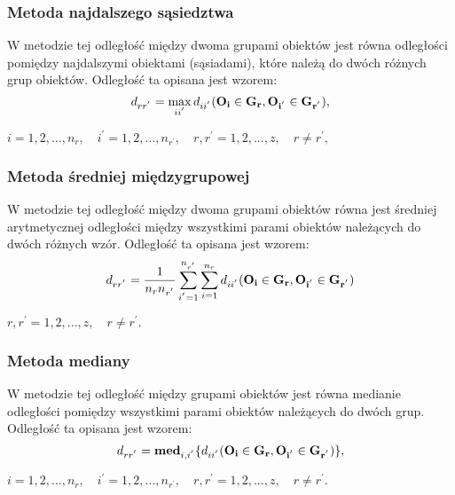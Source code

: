 \documentclass[12pt,a4paper]{report}
\begin{document}
\subsubsection{Metoda najdalszego sąsiedztwa}
\noindent

W metodzie tej odległość między dwoma grupami obiektów jest równa odległości pomiędzy najdalszymi obiektami (sąsiadami), które należą do dwóch różnych grup obiektów. Odległość ta opisana jest wzorem: 
\begin{equation}
d_{rr^{'}}= \max\limits_{ii^{'}} {d_{ii^{'}}(\bf{O_i} \in G_{r}, O_{i^{'}} \in G_{r^{'}})},
\end{equation}
\begin{center}
$i=1,2,...,n_{r}, \quad i^{'}=1,2,...,n_{r^{'}}, \quad r,r^{'}=1,2,...,z, \quad r \neq r^{'}, $
\end{center}

\subsubsection{Metoda średniej międzygrupowej}
\noindent

W metodzie tej odległość między dwoma grupami obiektów równa jest średniej arytmetycznej odległości między wszystkimi parami obiektów należących do dwóch różnych wzór. Odległość ta opisana jest wzorem: 
\begin{equation}
d_{rr^{'}}=\frac{1}{n_{r}n_{r^{'}}}\sum_{i^{'}=1}^{n_{r^{'}}}\sum_{i=1}^{n_{r}} d_{ii^{'}}(\bf{O_i} \in G_{r}, O_{i^{'}} \in G_{r^{'}})
\end{equation}
\begin{center}
$r,r^{'}=1,2,...,z, \quad r \neq r^{'}. $
\end{center}

\subsubsection{Metoda mediany}
\noindent

W metodzie tej odległość między grupami obiektów jest równa medianie odległości pomiędzy wszystkimi parami obiektów należących do dwóch grup. Odległość ta opisana jest wzorem: 
\begin{equation}
d_{rr^{'}}= \bold{med}_{i,i^{'}} \{d_{ii^{'}}(\bf{O_i} \in G_{r}, O_{i^{'}} \in G_{r^{'}})\},
\end{equation}
\begin{center}
$i=1,2,...,n_{r}, \quad i^{'}=1,2,...,n_{r^{'}}, \quad r,r^{'}=1,2,...,z, \quad r \neq r^{'}. $
\end{center}
\end{document}
